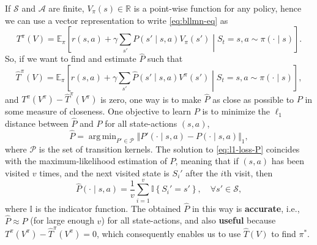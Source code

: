 \documentclass[a4paper]{article}
\theoremstyle{definition}
\newcommand{\cA}{\mathcal{A}}
\newcommand{\cS}{\mathcal{S}}
\newcommand{\cP}{\mathcal{P}}
\newcommand{\R}{\mathbb{R}}
\newcommand{\II}{\mathbb{I}}
\newcommand{\E}{\mathbb{E}}
\DeclareMathOperator*{\argmin}{arg\,min}
\begin{document}
If $\cS$ and $\cA$ are finite, $V_\pi(s) \in \R$ is a point-wise function for any policy, hence we can use a vector representation to write \cref{eq:bllmn-eq} as
\begin{equation*}
    T^\pi (V) = \E_\pi \left[r(s, a) + \gamma \sum_{s'}P\left(s' \middle\vert s, a\right)V_\pi\left(s'\right) \middle\vert S_t = s, a \sim \pi(\cdot \mid s)\right].
\end{equation*}
%
So, if we want to find and estimate $\widehat{P}$ such that 
\begin{equation*}
    \widehat{T}^\pi (V) = \E_\pi \left[r(s, a) + \gamma \sum_{s'}\widehat{P}\left(s' \middle\vert s, a\right)V^\pi\left(s'\right) \middle\vert S_t = s, a \sim \pi(\cdot \mid s)\right],
\end{equation*}
%
and $T^\pi(V^\pi) - \widehat{T}^\pi(V^\pi)$ is zero, one way is to make $\widehat{P}$ as close as possible to $P$ in some measure of closeness. One objective to learn $P$ is to minimize the $\ell_1$ distance between $\widehat{P}$ and $P$ for all state-actions $(s, a)$,
%
\begin{equation}
    \label{eq:l1-loss-P}
   \widehat{P} = \argmin_{P' \in \cP} \Vert P'(\cdot \mid s, a) - P(\cdot \mid s, a) \Vert_1, 
\end{equation}
%
where $\cP$ is the set of transition kernels. The solution to \cref{eq:l1-loss-P} coincides with the maximum-likelihood estimation of $P$, meaning that if $(s, a)$ has been visited $v$ times, and the next visited state is $S_i'$ after the $i$th visit, then
\begin{equation*}
    \widehat{P}(\cdot \mid s, a) = \frac{1}{v}\sum_{i = 1}^{v}\II\left\{S_i' = s'\right\}, \quad \forall s' \in \cS,
\end{equation*}
%
where $\II$ is the indicator function. The obtained $\widehat{P}$ in this way is \textbf{accurate}, i.e., $\widehat{P} \approx P$ (for large enough $v$) for all state-actions, and also \textbf{useful} because $T^\pi(V^\pi)- \widehat{T}^\pi(V^\pi) = 0$, which consequently enables us to use $\widehat{T}(V)$ to find $\pi^*$.
\end{document}
